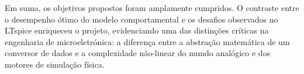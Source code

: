 Em suma, os objetivos propostos foram amplamente cumpridos. O contraste entre o desempenho ótimo do modelo
comportamental e os desafios observados no LTspice enriqueceu o projeto, evidenciando uma das distinções
críticas na engenharia de microeletrónica: a diferença entre a abstração matemática de um conversor de dados
e a complexidade não-linear do mundo analógico e dos motores de simulação física.